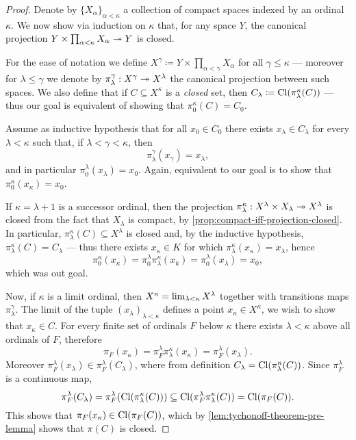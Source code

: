 \begin{proof}
Denote by \(\{X_{\alpha}\}_{\alpha < \kappa}\) a collection of compact spaces
indexed by an ordinal \(\kappa\). We now show via induction on \(\kappa\) that,
for any space \(Y\), the canonical projection
\(Y \times \prod_{\alpha < \kappa} X_{\alpha} \twoheadrightarrow Y\) is closed.

For the ease of notation we define
\(X^{\gamma} \coloneq Y \times \prod_{\alpha < \gamma} X_{\alpha}\) for all
\(\gamma \leq \kappa\) --- moreover for \(\lambda \leq \gamma\) we denote by
\(\pi_{\lambda}^{\gamma}: X^{\gamma} \twoheadrightarrow X^{\lambda}\) the canonical projection
between such spaces. We also define that if \(C \subseteq X^{\kappa}\) is a
\emph{closed} set, then \(C_{\lambda} \coloneq \operatorname{Cl}(\pi_{\lambda}^{\kappa}(C))\)
--- thus our goal is equivalent of showing that \(\pi_0^{\kappa}(C) = C_0\).

Assume as inductive hypothesis that for all \(x_0 \in C_0\) there exists
\(x_{\lambda} \in C_{\lambda}\) for every \(\lambda < \kappa\) such that, if
\(\lambda < \gamma < \kappa\), then
\[
\pi_{\lambda}^{\gamma}(x_{\gamma}) = x_{\lambda},
\]
and in particular \(\pi_0^{\lambda}(x_{\lambda}) = x_0\). Again, equivalent to
our goal is to show that \(\pi_0^{\kappa}(x_{\kappa}) = x_0\).

If \(\kappa = \lambda + 1\) is a successor ordinal, then the projection
\(\pi_{\lambda}^{\kappa}: X^{\lambda} \times X_{\lambda} \twoheadrightarrow X^{\lambda}\) is
closed from the fact that \(X_{\lambda}\) is compact, by
\cref{prop:compact-iff-projection-closed}. In particular,
\(\pi_{\lambda}^{\kappa}(C) \subseteq X^{\lambda}\) is closed and, by the
inductive hypothesis, \(\pi_{\lambda}^{\kappa}(C) = C_{\lambda}\) --- thus there
exists \(x_{\kappa} \in K\) for which
\(\pi_{\lambda}^{\kappa}(x_{\kappa}) = x_{\lambda}\), hence
\[
\pi_0^{\kappa}(x_{\kappa})
= \pi_0^{\lambda} \pi_{\lambda}^{\kappa}(x_k)
= \pi_0^{\lambda}(x_{\lambda})
= x_0,
\]
which was out goal.

Now, if \(\kappa\) is a limit ordinal, then
\(X^{\kappa} = \operatorname{lim}_{\lambda < \kappa} X^{\lambda}\) together with
transitions maps \(\pi_{\lambda}^{\gamma}\). The limit of the tuple
\((x_{\lambda})_{\lambda < \kappa}\) defines a point
\(x_{\kappa} \in X^\kappa\), we wish to show that \(x_{\kappa} \in C\). For
every finite set of ordinals \(F\) below \(\kappa\) there exists
\(\lambda < \kappa\) above all ordinals of \(F\), therefore
\[
\pi_F(x_{\kappa})
= \pi_F^{\lambda}\pi_{\lambda}^{\kappa}(x_{\kappa})
= \pi_F^{\lambda}(x_{\lambda}).
\]
Moreover \(\pi_F^{\lambda}(x_{\lambda}) \in \pi_F^{\lambda}(C_{\lambda})\),
where from definition \(C_{\lambda} =
\operatorname{Cl}(\pi_{\lambda}^{\kappa}(C))\). Since \(\pi_F^{\lambda}\) is a
continuous map,
\[
\pi_F^{\lambda}(C_{\lambda})
= \pi_F^{\lambda}(\operatorname{Cl}(\pi_{\lambda}^{\kappa}(C)))
\subseteq \operatorname{Cl}(\pi_F^{\lambda} \pi_{\lambda}^{\kappa}(C))
= \operatorname{Cl}(\pi_F(C)).
\]
This shows that \(\pi_F(x_{\kappa}) \in \operatorname{Cl}(\pi_F(C))\), which by
\cref{lem:tychonoff-theorem-pre-lemma} shows that \(\pi(C)\) is closed.
\end{proof}

